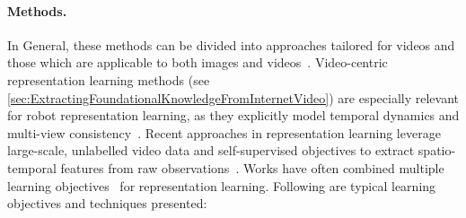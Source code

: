 \paragraph{Methods.}
In General, these methods can be divided into approaches tailored for videos and those which are applicable to both images and videos~\cite{Eze2024LearningBW}.
Video-centric representation learning methods (see \autoref{sec:ExtractingFoundationalKnowledgeFromInternetVideo}) are especially relevant for robot representation learning, as they explicitly model temporal dynamics and multi-view consistency~\cite{Sermanet2017TimeContrastiveNS, Chen2021LearningGR}. 
Recent approaches in representation learning leverage large-scale, unlabelled video data and self-supervised objectives to extract spatio-temporal features from raw observations~\cite{Bousmalis2023RoboCatAS, Brohan2022RT1RT}. 
Works have often combined multiple learning objectives~\cite{Nair2022R3MAU, Ma2023LIVLR, Karamcheti2023LanguageDrivenRL} for representation learning. Following are typical learning objectives and techniques presented:
